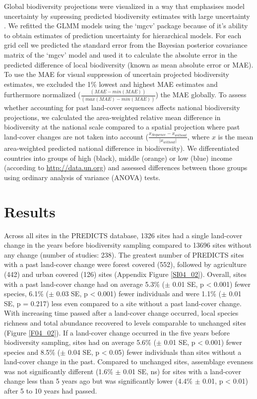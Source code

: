 Global biodiversity projections were visualized in a way that emphasises model uncertainty by supressing predicted biodiversity estimates with large uncertainty \citep{Correll2018}. We refitted the GLMM models using the ‘mgcv’ package \citep[ver. 1.8-24, ][]{Wood2011} because of it's ability to obtain estimates of prediction uncertainty for hierarchical models. For each grid cell we predicted the standard error from the Bayesian posterior covariance matrix of the ‘mgcv’ model \citep{Wood2011} and used it to calculate the absolute error in the predicted difference of local biodiversity (known as mean absolute error or MAE). To use the MAE for visual suppression of uncertain projected biodiversity estimates, we excluded the 1\% lowest and highest MAE estimates and furthermore normalized ($ \frac{(MAE - min(MAE) )}{(max(MAE) - min(MAE))} $) the MAE globally. To assess whether accounting for past land-cover sequences affects national biodiversity projections, we calculated the area-weighted relative mean difference in biodiversity at the national scale compared to a spatial projection where past land-cover changes are not taken into account ($\frac{x_{Sequence} -x_{without} }{|x_{without}|}$, where $x$ is the mean area-weighted predicted national difference in biodiversity). We differentiated countries into groups of high (black), middle (orange) or low (blue) income (according to \href{http://data.un.org}{http://data.un.org}) and assessed differences between those groups using ordinary analysis of variance (ANOVA) tests.

\section{Results}
\label{C04_03}

Across all sites in the PREDICTS database, 1326 sites had a single land-cover change in the years before biodiversity sampling compared to 13696 sites without any change (number of studies: 238). The greatest number of PREDICTS sites with a past land-cover change were forest covered (552), followed by agriculture (442) and urban covered (126) sites (Appendix Figure \ref{SI04_02}). Overall, sites with a past land-cover change had on average 5.3\% ($\pm$ 0.01 SE, p < 0.001) fewer species, 6.1\% ($\pm$ 0.03 SE, p < 0.001) fewer individuals and were 1.1\% ($\pm$ 0.01 SE, p = 0.217) less even compared to a site without a past land-cover change. With increasing time passed after a land-cover change occurred, local species richness and total abundance recovered to levels comparable to unchanged sites (Figure \ref{F04_02}). If a land-cover change occurred in the five years before biodiversity sampling, sites had on average 5.6\% ($\pm$ 0.01 SE, p < 0.001) fewer species and 8.5\% ($\pm$ 0.04 SE, p < 0.05) fewer individuals than sites without a land-cover change in the past. Compared to unchanged sites, assemblage evenness was not significantly different (1.6\% $\pm$ 0.01 SE, ns) for sites with a land-cover change less than 5 years ago but was significantly lower (4.4\% $\pm$ 0.01, p < 0.01) after 5 to 10 years had passed. 


